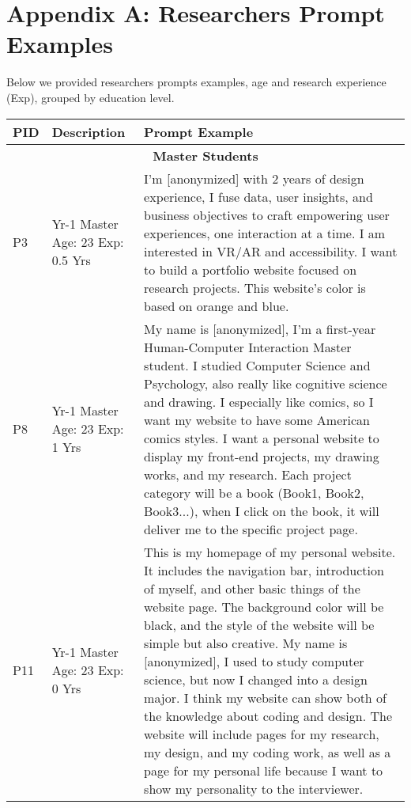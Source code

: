 


\appendix

\newpage

\section{Appendix A: Researchers Prompt Examples}
\label{appendix:a}

Below we provided researchers prompts examples, age and research experience (Exp), grouped by education level.

\begin{longtable}{|p{1cm}|p{2cm}|p{10cm}|}
\hline
\textbf{PID} & \textbf{Description} & \textbf{Prompt Example} \\ \hline
\multicolumn{3}{|c|}{\textbf{Master Students}} \\ \hline
P3 & Yr-1 Master \newline Age: 23 \newline Exp: 0.5 Yrs & I'm [anonymized] with 2 years of design experience, I fuse data, user insights, and business objectives to craft empowering user experiences, one interaction at a time. \newline I am interested in VR/AR and accessibility. I want to build a portfolio website focused on research projects. This website's color is based on orange and blue. \\ \hline
P8 & Yr-1 Master \newline Age: 23 \newline Exp: 1 Yrs & My name is [anonymized], I'm a first-year Human-Computer Interaction Master student. I studied Computer Science and Psychology, also really like cognitive science and drawing. I especially like comics, so I want my website to have some American comics styles. I want a personal website to display my front-end projects, my drawing works, and my research. Each project category will be a book (Book1, Book2, Book3...), when I click on the book, it will deliver me to the specific project page. \\ \hline
P11 & Yr-1 Master \newline Age: 23 \newline Exp: 0 Yrs & This is my homepage of my personal website. It includes the navigation bar, introduction of myself, and other basic things of the website page. The background color will be black, and the style of the website will be simple but also creative. My name is [anonymized], I used to study computer science, but now I changed into a design major. I think my website can show both of the knowledge about coding and design. The website will include pages for my research, my design, and my coding work, as well as a page for my personal life because I want to show my personality to the interviewer. \\ \hline

\end{longtable}
